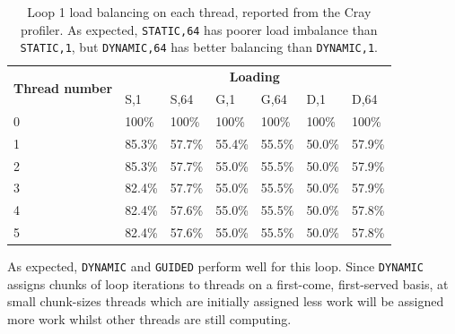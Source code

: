 \documentclass{article} %
\newcommand{\tp}{\texttt}
\begin{document}
\begin{table}[b]
    \centering
    \begin{tabular}{@{}lllllll@{}}
    \toprule
    \multirow{2}{*}{\textbf{Thread number}} & \multicolumn{6}{c}{\textbf{Loading}}                \\
                                            & S,1    & S,64   & G,1    & G,64   & D,1    & D,64   \\ \midrule
    0                                       & 100\%  & 100\%  & 100\%  & 100\%  & 100\%  & 100\%  \\
    1                                       & 85.3\% & 57.7\% & 55.4\% & 55.5\% & 50.0\% & 57.9\% \\
    2                                       & 85.3\% & 57.7\% & 55.0\% & 55.5\% & 50.0\% & 57.9\% \\
    3                                       & 82.4\% & 57.7\% & 55.0\% & 55.5\% & 50.0\% & 57.9\% \\
    4                                       & 82.4\% & 57.6\% & 55.0\% & 55.5\% & 50.0\% & 57.8\% \\
    5                                       & 82.4\% & 57.6\% & 55.0\% & 55.5\% & 50.0\% & 57.8\% \\ \bottomrule
    \end{tabular}
    \caption{Loop 1 load balancing on each thread, reported from the Cray profiler. As expected, \tp{STATIC,64} has poorer load imbalance than \tp{STATIC,1}, but \tp{DYNAMIC,64} has better balancing than \tp{DYNAMIC,1}.}
    \label{tbl:loop1profiling}
\end{table}

As expected, \tp{DYNAMIC} and \tp{GUIDED} perform well for this loop.
Since \tp{DYNAMIC} assigns chunks of loop iterations to threads on a first-come, first-served basis, at small chunk-sizes threads which are initially assigned less work will be assigned more work whilst other threads are still computing. 
\end{document}
